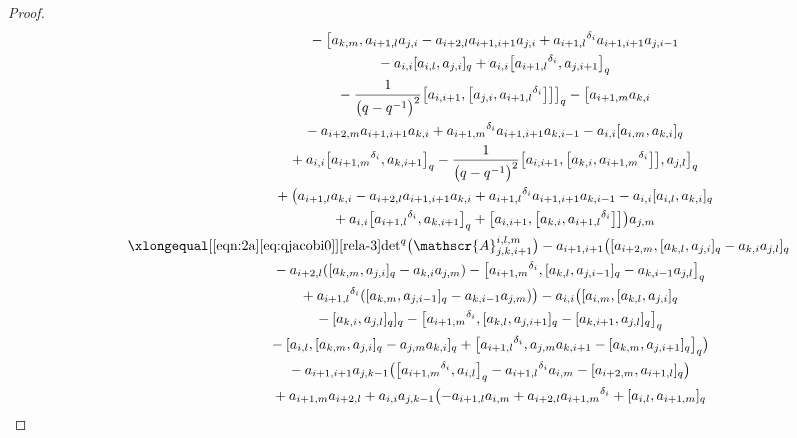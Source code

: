 \documentclass[pdftex]{sigma}
\numberwithin{equation}{section}
\def\d{\delta}
\def\A{\mathscr{A}}
\begin{document}
\begin{proof}
\begin{gather*}
 \quad\qquad\qquad\qquad\quad {}- \bigl[a_{k,m},a_{i+1,l}a_{j,i} -a_{i+2,l}a_{i+1,i+1}a_{j,i}+{a_{i+1,l}}^{\d_i} a_{i+1,i+1}a_{j,i-1}\\
 \quad\qquad\qquad\qquad\quad {}-a_{i,i} [a_{i,l},a_{j,i} ]_q +a_{i,i} \bigl[{a_{i+1,l}}^{\d_i} ,a_{j,i+1} \bigr]_q\\
 \quad\qquad\qquad\qquad\quad {}-\frac{1}{\bigl(q-q^{-1}\bigr)^2} \bigl[a_{i,i+1}, \bigl[a_{j,i}, {a_{i+1,l}}^{\d_i} \bigr] \bigr] \bigr]_q - \bigl[a_{i+1,m}a_{k,i} \\
 \quad\qquad\qquad\qquad\quad {}-a_{i+2,m}a_{i+1,i+1}a_{k,i} +{a_{i+1,m}}^{\d_i} a_{i+1,i+1}a_{k,i-1} -a_{i,i} [a_{i,m},a_{k,i} ]_q \\
\quad\qquad\qquad \qquad \quad {}+a_{i,i} \bigl[{a_{i+1,m}}^{\d_i} ,a_{k,i+1} \bigr]_q-\frac{1}{\bigl(q-q^{-1}\bigr)^2} \bigl[a_{i,i+1}, \bigl[a_{k,i}, {a_{i+1,m}}^{\d_i} \bigr] \bigr],a_{j,l} \bigr]_q \\
\quad\qquad\qquad \qquad \quad{}+ \bigl(a_{i+1,l}a_{k,i} -a_{i+2,l}a_{i+1,i+1}a_{k,i}+{a_{i+1,l}}^{\d_i} a_{i+1,i+1}a_{k,i-1} -a_{i,i} [a_{i,l},a_{k,i} ]_q \\
\quad\qquad\qquad\qquad \quad {}+a_{i,i} \bigl[{a_{i+1,l}}^{\d_i} ,a_{k,i+1} \bigr]_q + \bigl[a_{i,i+1}, \bigl[a_{k,i},{a_{i+1,l}}^{\d_i} \bigr] \bigr] \bigr)a_{j,m}\\
\quad\qquad \xlongequal[\eqref{eqn:2a}\eqref{eq:qjacobi0}]{\eqref{rela-3}} {\det}^q\bigl(\A_{j,k,i+1}^{i,l,m}\bigr)-a_{i+1,i+1} \bigl( [a_{i+2,m}, [a_{k,l}, a_{j,i} ]_q-a_{k,i}a_{j,l} ]_q\\
 \quad\qquad\qquad\qquad\ {}-a_{i+2,l} ( [a_{k,m},a_{j,i} ]_q -a_{k,i}a_{j,m} ) - \bigl[{a_{i+1,m}}^{\d_i}, [a_{k,l}, a_{j,i-1} ]_q -a_{k,i-1}a_{j,l} \bigr]_q \\
 \quad\qquad\qquad\qquad\ {}+{a_{i+1,l}}^{\d_i} ( [a_{k,m},a_{j,i-1} ]_q -a_{k,i-1}a_{j,m} ) \bigr) -a_{i,i} \bigl( [a_{i,m}, [a_{k,l},a_{j,i} ]_q\\
\quad\qquad\qquad\qquad\ {}- [a_{k,i}, a_{j,l} ]_q ]_q - \bigl[{a_{i+1,m}}^{\d_i}, [a_{k,l},a_{j,i+1} ]_q - [a_{k,i+1},a_{j,l} ]_q \bigr]_q\\
 \quad\qquad\qquad\qquad\ {}- [a_{i,l}, [a_{k,m},a_{j,i} ]_q -a_{j,m}a_{k,i} ]_q+ \bigl[{a_{i+1,l}}^{\d_i},a_{j,m}a_{k,i+1} - [a_{k,m},a_{j,i+1} ]_q \bigr]_q \bigr)\\
\quad\qquad\qquad\qquad\ {}-a_{i+1,i+1}a_{j,k-1} \bigl( \bigl[{a_{i+1,m}}^{\d_i},a_{i,l} \bigr]_q -{a_{i+1,l}}^{\d_i}a_{i,m} - [a_{i+2,m},a_{i+1,l} ]_q \bigr)\\
\quad\qquad\qquad\qquad\ {}+a_{i+1,m}a_{i+2,l} +a_{i,i}a_{j,k-1} \bigl(-a_{i+1,l}a_{i,m} +a_{i+2,l}{a_{i+1,m}}^{\d_i} + [a_{i,l},a_{i+1,m} ]_q \\

\end{gather*}
\end{proof}
\end{document}
